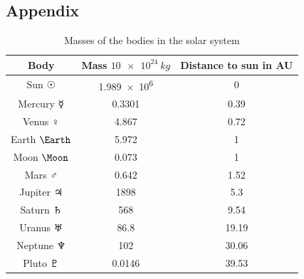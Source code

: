 \documentclass[10pt]{article}
\begin{document}
\begin{multicols}{2}
\section*{Appendix}
\begin{table}[H]
    \caption{Masses of the bodies in the solar system}
    \centering
    \begin{tabular}{| c | c | c | }
        \hline
        Body & Mass $\SI{10e24}{kg}$ & Distance to sun in AU\\
        \hline
        Sun      $\Sun$   & \SI{1.989e6}{}&  0 \\
        Mercury  $\Mercury$ & 0.3301    &  0.39 \\
        Venus    $\Venus$   & 4.867     &  0.72 \\
        Earth    $\Earth$   & 5.972     &  1 \\
        Moon     $\Moon$    & 0.073     &  1 \\
        Mars     $\Mars$    & 0.642     &  1.52 \\
        Jupiter  $\Jupiter$ & 1898      &  5.3 \\
        Saturn   $\Saturn$  & 568       &  9.54 \\
        Uranus   $\Uranus$  & 86.8      & 19.19 \\
        Neptune  $\Neptune$ & 102       & 30.06 \\
        Pluto    $\Pluto$   & 0.0146    & 39.53 \\
        \hline
    \end{tabular}
    \label{tab:CelestialMasses}
\end{table}


{}


\end{multicols}
\end{document}

